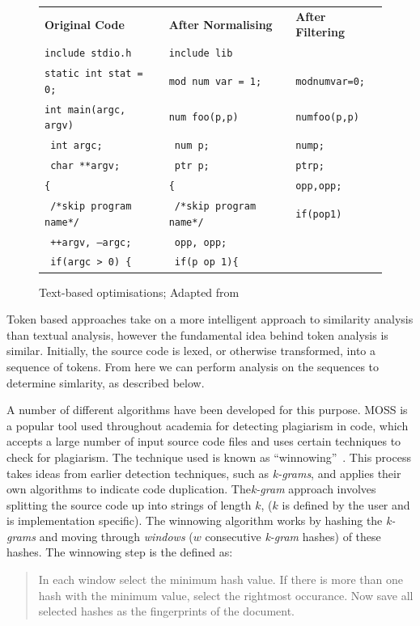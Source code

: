 \begin{figure}
\begin{tabular}{l l l}
\textbf{Original Code} & \textbf{After Normalising} & \textbf{After Filtering} \\
\texttt{include stdio.h} & \texttt{include lib} & \\
\texttt{static int stat = 0;} & \texttt{mod num var = 1;} & \texttt{modnumvar=0;}\\
\texttt{int main(argc, argv)} & \texttt{num foo(p,p)} & \texttt{numfoo(p,p)}\\
\texttt{  int argc;} & \texttt{  num p;} & \texttt{nump;}\\
\texttt{  char **argv;} & \texttt{  ptr p;} & \texttt{ptrp;}\\
\texttt{\{} & \texttt{\{} & \texttt{opp,opp;}\\
\texttt{  /*skip program name*/} & \texttt{  /*skip program name*/} & \texttt{if(pop1)}\\
\texttt{  ++argv, --argc;} & \texttt{  opp, opp;} & \\
\texttt{  if(argc > 0) \{} & \texttt{  if(p op 1)\{} & \\
\end{tabular}
\caption{Text-based optimisations; Adapted from\citep[p.~49]{CloneDetection}}
\label{code:optimisedText}
\end{figure}

Token based approaches take on a more intelligent approach to similarity analysis
than textual analysis, however the fundamental idea behind token analysis is similar.
Initially, the source code is lexed, or otherwise transformed, into a sequence of tokens.
From here we can perform analysis on the sequences to determine simlarity, as described
below.

A number of different algorithms have been developed for this purpose.
MOSS is a popular tool used throughout academia for detecting plagiarism
in code, which accepts a large number of input source code files and uses certain
techniques to check for plagiarism. The technique used is known as 
``winnowing''~\cite{winnowing}. This process takes ideas from earlier detection
techniques, such as \emph{k-grams}, and applies their own algorithms to indicate
code duplication. The\emph{k-gram} approach involves splitting the source code up into
strings of length $k$, ($k$ is defined by the user and is implementation specific).
The winnowing algorithm works by hashing the \emph{k-grams} and moving through 
\emph{windows} ($w$ consecutive \emph{k-gram} hashes)
of these hashes.
The winnowing step is the defined as: 
\begin{quote}In each window select the minimum hash value.
If there is more than one hash with the minimum value, select the rightmost
occurance. Now save all selected hashes as the fingerprints of the document.
\cite{winnowing}
\end{quote}


